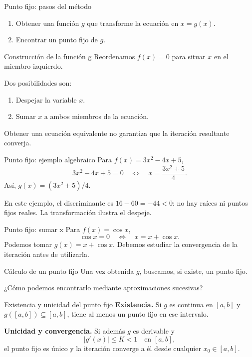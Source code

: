 \documentclass[main.tex]{subfiles}
\begin{document}
\begin{frame}{Punto fijo: pasos del método}
\begin{enumerate}\item Obtener una función $g$ que transforme la ecuación en $x=g(x)$.\item Encontrar un punto fijo de $g$.\end{enumerate}
\end{frame}

\begin{frame}{Construcción de la función g}
Reordenamos $f(x)=0$ para situar $x$ en el miembro izquierdo.\par\medskip Dos posibilidades son:\begin{enumerate}\item Despejar la variable $x$.\item Sumar $x$ a ambos miembros de la ecuación.\end{enumerate}Obtener una ecuación equivalente no garantiza que la iteración resultante converja.
\end{frame}

\begin{frame}{Punto fijo: ejemplo algebraico}
Para $f(x)=3x^2-4x+5$,\[3x^2-4x+5=0\quad\Longleftrightarrow\quad x=\frac{3x^2+5}{4}.\]Así, $g(x)=(3x^2+5)/4$.\par\medskip En este ejemplo, el discriminante es $16-60=-44<0$: no hay raíces ni puntos fijos reales. La transformación ilustra el despeje.
\end{frame}

\begin{frame}{Punto fijo: sumar x}
Para $f(x)=\cos x$,\[\cos x=0\quad\Longleftrightarrow\quad x=x+\cos x.\]Podemos tomar $g(x)=x+\cos x$. Debemos estudiar la convergencia de la iteración antes de utilizarla.
\end{frame}

\begin{frame}{Cálculo de un punto fijo}
Una vez obtenida $g$, buscamos, si existe, un punto fijo.\par\medskip ¿Cómo podemos encontrarlo mediante aproximaciones sucesivas?
\end{frame}

\begin{frame}{Existencia y unicidad del punto fijo}
\small\textbf{Existencia.} Si $g$ es continua en $[a,b]$ y $g([a,b])\subseteq[a,b]$, tiene al menos un punto fijo en ese intervalo.\par\medskip\textbf{Unicidad y convergencia.} Si además $g$ es derivable y\[|g\prime(x)|\le K<1\quad\text{en }[a,b],\]el punto fijo es único y la iteración converge a él desde cualquier $x_0\in[a,b]$.
\end{frame}
\end{document}
